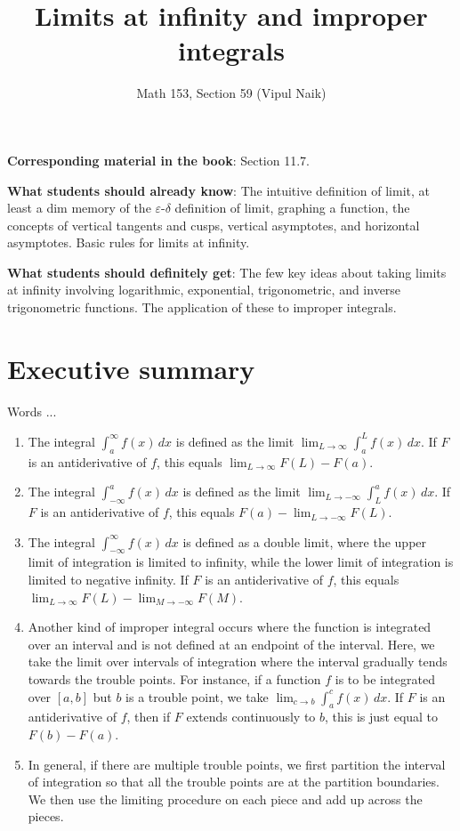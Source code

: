 \documentclass[10pt]{amsart}
\title{Limits at infinity and improper integrals}
\author{Math 153, Section 59 (Vipul Naik)}
\begin{document}
\maketitle

{\bf Corresponding material in the book}: Section 11.7.

{\bf What students should already know}: The intuitive definition of
limit, at least a dim memory of the $\varepsilon$-$\delta$ definition of
limit, graphing a function, the concepts of vertical tangents and
cusps, vertical asymptotes, and horizontal asymptotes. Basic rules for
limits at infinity.

{\bf What students should definitely get}: The few key ideas about
taking limits at infinity involving logarithmic, exponential,
trigonometric, and inverse trigonometric functions. The application of
these to improper integrals.

\section*{Executive summary}

Words ...

\begin{enumerate}
\item The integral $\int_a^\infty f(x) \, dx$ is defined as the limit
  $\lim_{L \to \infty} \int_a^L f(x) \, dx$. If $F$ is an
  antiderivative of $f$, this equals $\lim_{L \to \infty} F(L) - F(a)$.
\item The integral $\int_{-\infty}^a f(x) \, dx$ is defined as the
  limit $\lim_{L \to -\infty} \int_L^a f(x) \, dx$. If $F$ is an
  antiderivative of $f$, this equals $F(a) - \lim_{L \to -\infty} F(L)$.
\item The integral $\int_{-\infty}^\infty f(x) \, dx$ is defined as a
  double limit, where the upper limit of integration is limited to
  infinity, while the lower limit of integration is limited to
  negative infinity. If $F$ is an antiderivative of $f$, this equals
  $\lim_{L \to \infty} F(L) - \lim_{M \to -\infty} F(M)$.
\item Another kind of improper integral occurs where the function is
  integrated over an interval and is not defined at an endpoint of the
  interval. Here, we take the limit over intervals of integration
  where the interval gradually tends towards the trouble points. For
  instance, if a function $f$ is to be integrated over $[a,b]$ but $b$
  is a trouble point, we take $\lim_{c \to b} \int_a^c f(x) \, dx$. If
  $F$ is an antiderivative of $f$, then if $F$ extends continuously to
  $b$, this is just equal to $F(b) - F(a)$.
\item In general, if there are multiple trouble points, we first
  partition the interval of integration so that all the trouble points
  are at the partition boundaries. We then use the limiting procedure
  on each piece and add up across the pieces.
\end{enumerate}
\end{document}
